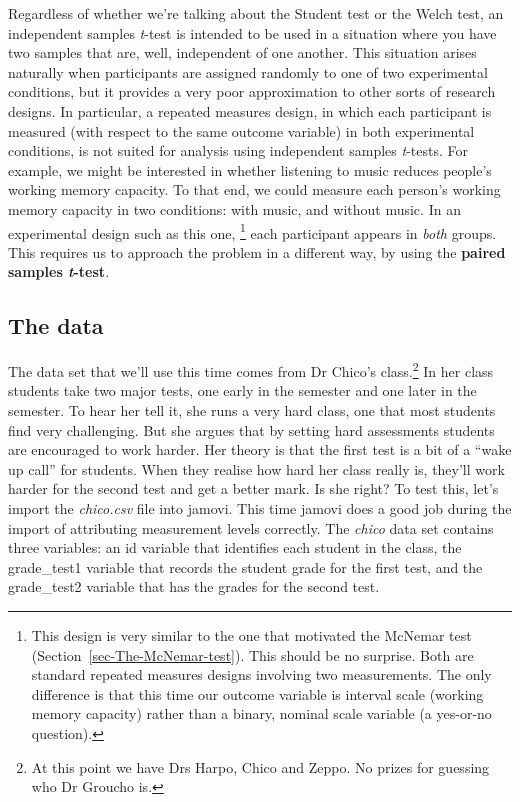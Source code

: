 \documentclass[
  a4paper,
]{book}
\begin{document}
Regardless of whether we're talking about the Student test or the Welch
test, an independent samples \emph{t}-test is intended to be used in a
situation where you have two samples that are, well, independent of one
another. This situation arises naturally when participants are assigned
randomly to one of two experimental conditions, but it provides a very
poor approximation to other sorts of research designs. In particular, a
repeated measures design, in which each participant is measured (with
respect to the same outcome variable) in both experimental conditions,
is not suited for analysis using independent samples \emph{t}-tests. For
example, we might be interested in whether listening to music reduces
people's working memory capacity. To that end, we could measure each
person's working memory capacity in two conditions: with music, and
without music. In an experimental design such as this one, \footnote{This
  design is very similar to the one that motivated the McNemar test
  (Section~\ref{sec-The-McNemar-test}). This should be no surprise. Both
  are standard repeated measures designs involving two measurements. The
  only difference is that this time our outcome variable is interval
  scale (working memory capacity) rather than a binary, nominal scale
  variable (a yes-or-no question).} each participant appears in
\emph{both} groups. This requires us to approach the problem in a
different way, by using the \textbf{paired samples \emph{t}-test}.

\hypertarget{the-data-1}{%
\subsection{The data}\label{the-data-1}}

The data set that we'll use this time comes from Dr Chico's
class.\footnote{At this point we have Drs Harpo, Chico and Zeppo. No
  prizes for guessing who Dr Groucho is.} In her class students take two
major tests, one early in the semester and one later in the semester. To
hear her tell it, she runs a very hard class, one that most students
find very challenging. But she argues that by setting hard assessments
students are encouraged to work harder. Her theory is that the first
test is a bit of a ``wake up call'' for students. When they realise how
hard her class really is, they'll work harder for the second test and
get a better mark. Is she right? To test this, let's import the
\emph{chico.csv} file into jamovi. This time jamovi does a good job
during the import of attributing measurement levels correctly. The
\emph{chico} data set contains three variables: an id variable that
identifies each student in the class, the grade\_test1 variable that
records the student grade for the first test, and the grade\_test2
variable that has the grades for the second test.
\end{document}
